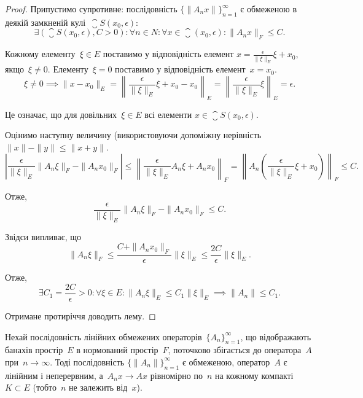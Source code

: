 \begin{proof}
Припустимо супротивне: послідовність
$\{\|A_n x\|\}_{n = 1}^\infty$
є обмеженою в деякій замкненій кулі~$\closure S(x_0, \epsilon)$:
\begin{equation*}
    \exists (\closure S(x_0, \epsilon), C > 0):
    \forall n \in N:
    \forall x \in \closure(x_0, \epsilon):
    \|A_n x\|_F \le C.
\end{equation*}

Кожному елементу~$\xi \in E$ поставимо у відповідність елемент
$x = \frac{\epsilon}{\|\xi\|_E} \xi + x_0$, якщо~$\xi \ne 0$.
Елементу~$\xi = 0$ поставимо у відповідність елемент~$x = x_0$.
\begin{equation*}
    \xi \ne 0 \implies
    \|x - x_0\|_E =
    \left\| \frac{\epsilon}{\|\xi\|_E} \xi + x_0 - x_0 \right\|_E =
    \left\| \frac{\epsilon}{\|\xi\|_E} \xi \right\|_E =
    \epsilon.
\end{equation*}

Це означає, що для довільних~$\xi \in E$ всі елементи
$x \in \closure S(x_0, \epsilon)$.

Оцінимо наступну величину (використовуючи допоміжну
нерівність~$\|x\| - \|y\| \le \|x + y\|$.
\begin{equation}
    \left| \frac{\epsilon}{\|\xi\|_E} \|A_n \xi\|_F - \|A_n x_0\|_F \right| \le
    \left\| \frac{\epsilon}{\|\xi\|_E} A_n \xi + A_n x_0 \right\|_F =
    \left\| A_n \left( \frac{\epsilon}{\|\xi\|_E} \xi + x_0 \right) \right\|_F \le C.
\end{equation}

Отже,
\begin{equation*}
    \frac{\epsilon}{\|\xi\|_E} \|A_n \xi\|_F - \|A_n x_0\|_F \le C.
\end{equation*}

Звідси випливає, що
\begin{equation*}
    \|A_n \xi\|_F \le
    \frac{C + \|A_n x_0\|_F}{\epsilon} \|\xi\|_E \le
    \frac{2 C}{\epsilon} \|\xi\|_E.
\end{equation*}

Отже,
\begin{equation*}
    \exists C_1 = \frac{2 C}{\epsilon} > 0:
    \forall \xi \in E:
    \|A_n \xi\|_E \le C_1 \|\xi\|_E \implies
    \|A_n\| \le C_1.
\end{equation*}

Отримане протиріччя доводить лему.
\end{proof}

\begin{theorem}
 Нехай послідовність
лінійних обмежених операторів~$\{A_n\}_{n = 1}^\infty$, що відображають
банахів простір~$E$ в нормований простір~$F$, поточково
збігається до оператора~$A$ при~$n \to \infty$. Тоді послідовність
$\{\|A_n\|\}_{n = 1}^\infty$ є обмеженою, оператор~$A$ є лінійним і
неперервним, а~$A_n x \to A x$ рівномірно по~$n$ на кожному
компакті~$K \subset E$ (тобто~$n$ не залежить від~$x$).
\end{theorem}

